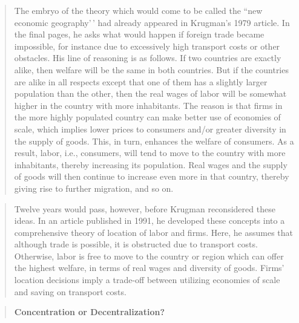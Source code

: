 \documentclass[
  12pt,
  oneside]{book}
\theoremstyle{definition}
\theoremstyle{definition}
\theoremstyle{definition}
\theoremstyle{definition}
\theoremstyle{remark}
\begin{document}
\begin{quote}
The embryo of the theory which would come to be called the ``new economic geography'\,' had already appeared in Krugman's 1979 article. In the final pages, he asks what would happen if foreign trade became impossible, for instance due to excessively high transport costs or other obstacles. His line of reasoning is as follows. If two countries are exactly alike, then welfare will be the same in both countries. But if the countries are alike in all respects except that one of them has a slightly larger population than the other, then the real wages of labor will be somewhat higher in the country with more inhabitants. The reason is that firms in the more highly populated country can make better use of economies of scale, which implies lower prices to consumers and/or greater diversity in the supply of goods. This, in turn, enhances the welfare of consumers. As a result, labor, i.e., consumers, will tend to move to the country with more inhabitants, thereby increasing its population. Real wages and the supply of goods will then continue to increase even more in that country, thereby giving rise to further migration, and so on.
\end{quote}

\begin{quote}
Twelve years would pass, however, before Krugman reconsidered these ideas. In an article published in 1991, he developed these concepts into a comprehensive theory of location of labor and firms. Here, he assumes that although trade is possible, it is obstructed due to transport costs. Otherwise, labor is free to move to the country or region which can offer the highest welfare, in terms of real wages and diversity of goods. Firms' location decisions imply a trade-off between utilizing economies of scale and saving on transport costs.
\end{quote}

\begin{quote}
\textbf{Concentration or Decentralization?}
\end{quote}
\end{document}
